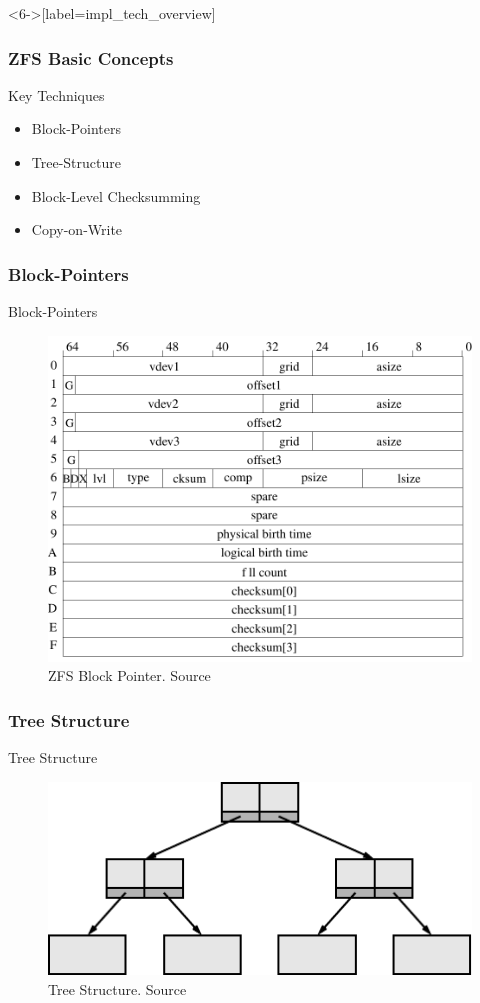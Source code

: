 \begin{frame}<6->[label=impl_tech_overview]
	\frametitle{ZFS Basic Concepts}
	{\Large Key Techniques}\\
	\begin{itemize}
		\item \alert<2>{Block-Pointers}
		\item \alert<3>{Tree-Structure}
		\item \alert<4>{Block-Level Checksumming}
		\item \alert<5>{Copy-on-Write}
	\end{itemize}
\end{frame}

\subsubsection{Block-Pointers}
\begin{frame}{Block-Pointers}
	\begin{figure}
	\centering
	\includegraphics[height=0.75\textheight]{assets/on_disk/block_pointer}
	\caption{ZFS Block Pointer. Source \cite{introimplzfs}}
	\end{figure}
\end{frame}

\subsubsection{Tree Structure}
\begin{frame}{Tree Structure}
	\begin{figure}
	\centering
	\includegraphics[width=0.6\linewidth]{assets/on_disk/tree_structure}
	\caption{Tree Structure. Source \cite{zfs2003}}
	\end{figure}
\end{frame}

